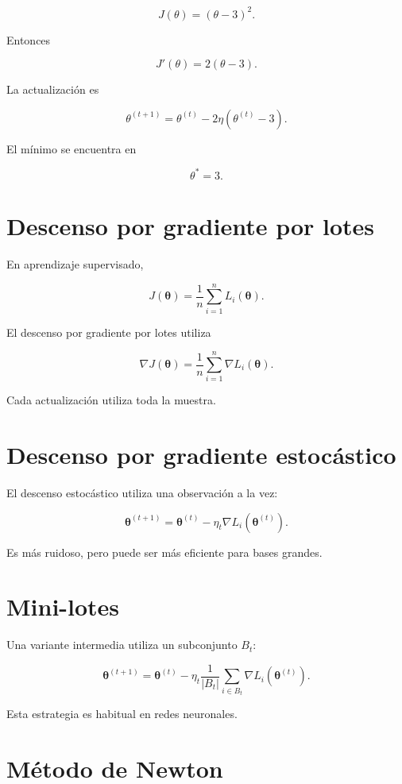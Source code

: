 \documentclass[
  spanish,
  11pt,
  letterpaper,
  DIV=11,
  numbers=noendperiod]{scrreprt}
\theoremstyle{definition}
\theoremstyle{plain}
\theoremstyle{definition}
\theoremstyle{remark}
\begin{document}
\[
J(\theta)
=
(\theta-3)^2.
\]

Entonces

\[
J'(\theta)
=
2(\theta-3).
\]

La actualización es

\[
\theta^{(t+1)}
=
\theta^{(t)}
-
2\eta
(
\theta^{(t)}-3
).
\]

El mínimo se encuentra en

\[
\theta^{*}=3.
\]

\section{Descenso por gradiente por
lotes}\label{descenso-por-gradiente-por-lotes}

En aprendizaje supervisado,

\[
J(\boldsymbol{\theta})
=
\frac{1}{n}
\sum_{i=1}^{n}
L_i(\boldsymbol{\theta}).
\]

El descenso por gradiente por lotes utiliza

\[
\nabla J(\boldsymbol{\theta})
=
\frac{1}{n}
\sum_{i=1}^{n}
\nabla L_i(\boldsymbol{\theta}).
\]

Cada actualización utiliza toda la muestra.

\section{Descenso por gradiente
estocástico}\label{descenso-por-gradiente-estocuxe1stico}

El descenso estocástico utiliza una observación a la vez:

\[
\boldsymbol{\theta}^{(t+1)}
=
\boldsymbol{\theta}^{(t)}
-
\eta_t
\nabla L_i(
\boldsymbol{\theta}^{(t)}
).
\]

Es más ruidoso, pero puede ser más eficiente para bases grandes.

\section{Mini-lotes}\label{mini-lotes}

Una variante intermedia utiliza un subconjunto \(B_t\):

\[
\boldsymbol{\theta}^{(t+1)}
=
\boldsymbol{\theta}^{(t)}
-
\eta_t
\frac{1}{|B_t|}
\sum_{i\in B_t}
\nabla L_i(
\boldsymbol{\theta}^{(t)}
).
\]

Esta estrategia es habitual en redes neuronales.

\section{Método de Newton}\label{muxe9todo-de-newton}
\end{document}
